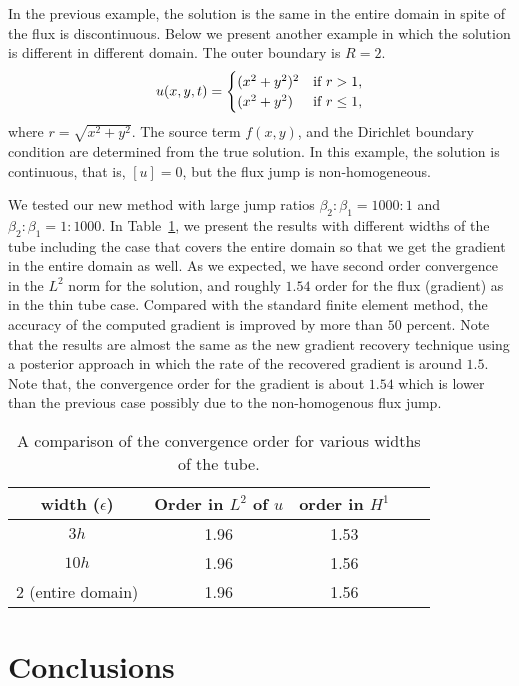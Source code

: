 \documentclass[11pt]{article}
\numberwithin{equation}{section}
\begin{document}
In the previous example, the solution is the same in the entire domain in spite of the flux is discontinuous.
Below we present another example in which the solution is different in different domain.
The outer boundary is $R=2$.
\begin{equation}\label{}
u(x,y,t) =
\begin{cases}
 (x^2 + y^2)^2   & \mbox{if $ r > 1, $}\\
 (x^2 + y^2)     & \mbox{if $ r \leq 1, $}
 \end{cases}
\end{equation}
where $r=\sqrt{x^2 + y^2}$.
The source term $f(x,y)$,
and the Dirichlet boundary condition are  determined from the true solution.
In this example, the solution is continuous, that is, $[u]=0$, but the flux jump is non-homogeneous.

We tested our new method with large jump ratios $\beta_2 : \beta_1=1000:1$ and $\beta_2 : \beta_1=1:1000$.
In Table~\ref{table53 ch2},
we present the results with different widths of the tube
including the case that covers the entire domain
so that we get the gradient in the entire domain as well.
As we expected,
we have second order convergence in the $L^2$ norm for the solution,
and roughly $1.54$ order for the flux (gradient) as in the thin tube case.
Compared with the standard finite element method, the accuracy of the computed gradient is improved by more than $50$ percent.
Note that the results are almost the same as the new gradient recovery technique using a posterior approach \cite{guo-yang16}
in which the rate of the recovered gradient is around $1.5$.
Note that, the convergence order for the gradient is about $1.54$
which is lower than the previous case possibly due to the non-homogenous flux jump.

\begin{table}[H]
\centering
\begin{tabular}{|c|c|c|c|c|}
\hline
width ($\epsilon$) &Order in $L^2$ of $u$  & order in $H^1$  \\
\hline
 $3h$  & 1.96 & 1.53\\
\hline
 $10h$  & 1.96 & 1.56\\
\hline
 2 (entire domain) & 1.96 & 1.56\\
\hline
\end{tabular}
\caption{A comparison of the convergence order for various widths  of the tube.\label{table53 ch2}}
\end{table}




\section{Conclusions}
\end{document}
